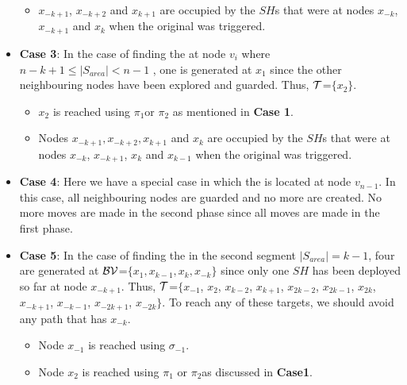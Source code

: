 \begin{itemize}
\begin{itemize}
\item $x_{-k+1}$, $x_{-k+2}$ and $x_{k+1}$ are occupied by the $SH$s that were at nodes $x_{-k}$, $x_{-k+1}$ and $x_{k}$ when the original \bv was triggered. 
\end{itemize}



\item {\bf Case 3}: In the case of finding the \bv at node $v_{i}$ where $n-k+1 \leq |S_{area}| <n-1$ , one \bv is generated at $x_1$ since the other neighbouring nodes have been explored and guarded. Thus,
$\cal T$=$\{x_2\}$.

\begin{itemize}
\item $x_2$ is reached using $\pi_1$or $\pi_2$ as mentioned in {\bf Case 1}.

\item Nodes $x_{-k+1},x_{-k+2},x_{k+1}$ and $x_{k}$ are occupied by the $SH$s that were at nodes $x_{-k}$, $x_{-k+1}$, $x_{k}$ and $x_{k-1}$ when the original \bv was triggered.
\end{itemize}


\item {\bf Case 4}: Here we have a special case in which the \bv is located at node $v_{n-1}$. In this case, all neighbouring nodes are guarded and no more \bvs are created. No more moves are made in the second phase since all moves are made in the first phase.




\item {\bf Case 5}: In the case of finding the \bv in the second segment $ |S_{area}| =k-1$, four \bvs are generated at $\cal BV$=$\{x_1,x_{k-1},x_k,x_{-k}\}$ since only one $SH$ has been deployed so far at node $x_{-k+1}$. Thus,
 $\cal T$=$\{ x_{-1}$,  $x_{2}$, $x_{k-2}$, $x_{k+1}$, $x_{2k-2}$, $x_{2k-1}$, $x_{2k}$, $x_{-k+1}$,  $x_{-k-1}$,  $x_{-2k+1}$, $x_{-2k} \}$. To reach any of these targets, we should avoid any path that has $x_{-k}$.
\begin{itemize}
\item Node $x_{-1}$ is reached using $\sigma_{-1}$.
\item Node $x_{2}$ is reached using $\pi_1$ or $\pi_2$as discussed in {\bf Case1}.


\end{itemize}
\end{itemize}
